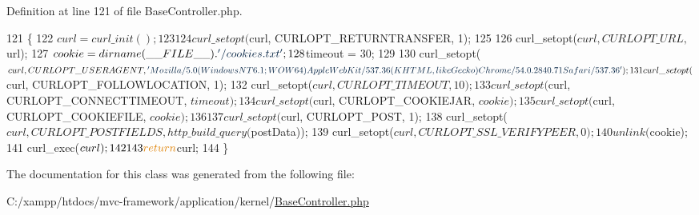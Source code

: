 Definition at line 121 of file Base\+Controller.\+php.


\begin{DoxyCode}
121                                                 \{
122         $curl = curl\_init();
123 
124         curl\_setopt($curl, CURLOPT\_RETURNTRANSFER, 1); 
125 
126         curl\_setopt($curl, CURLOPT\_URL, $url);
127         $cookie = dirname(\_\_FILE\_\_) . \textcolor{stringliteral}{'/cookies.txt'};
128         $timeout = 30;
129 
130         curl\_setopt($curl, CURLOPT\_USERAGENT, \textcolor{stringliteral}{'Mozilla/5.0 (Windows NT 6.1; WOW64) AppleWebKit/537.36
       (KHTML, like Gecko) Chrome/54.0.2840.71 Safari/537.36'});
131         curl\_setopt($curl, CURLOPT\_FOLLOWLOCATION, 1);
132         curl\_setopt($curl, CURLOPT\_TIMEOUT, 10); 
133         curl\_setopt($curl, CURLOPT\_CONNECTTIMEOUT, $timeout);
134         curl\_setopt($curl, CURLOPT\_COOKIEJAR, $cookie);
135         curl\_setopt($curl, CURLOPT\_COOKIEFILE, $cookie);
136 
137         curl\_setopt($curl, CURLOPT\_POST, 1); 
138         curl\_setopt($curl, CURLOPT\_POSTFIELDS, http\_build\_query($postData));     
139         curl\_setopt($curl, CURLOPT\_SSL\_VERIFYPEER, 0);
140         unlink($cookie);
141         curl\_exec($curl);
142 
143         \textcolor{keywordflow}{return} $curl;
144     \}
\end{DoxyCode}


The documentation for this class was generated from the following file\+:\begin{DoxyCompactItemize}
\item 
C\+:/xampp/htdocs/mvc-\/framework/application/kernel/\hyperlink{_base_controller_8php}{Base\+Controller.\+php}\end{DoxyCompactItemize}
